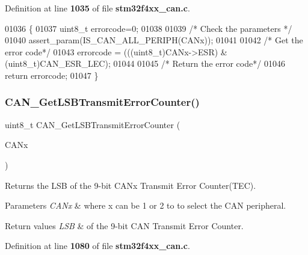 Definition at line \textbf{ 1035} of file \textbf{ stm32f4xx\+\_\+can.\+c}.


\begin{DoxyCode}
01036 \{
01037   uint8\_t errorcode=0;
01038   
01039   \textcolor{comment}{/* Check the parameters */}
01040   assert_param(IS_CAN_ALL_PERIPH(CANx));
01041   
01042   \textcolor{comment}{/* Get the error code*/}
01043   errorcode = (((uint8\_t)CANx->ESR) & (uint8\_t)CAN_ESR_LEC);
01044   
01045   \textcolor{comment}{/* Return the error code*/}
01046   \textcolor{keywordflow}{return} errorcode;
01047 \}
\end{DoxyCode}
\mbox{\label{group__CAN__Group5_ga85ee0c35bf7ca15d4e4c862eef534843}} 
\subsubsection{C\+A\+N\+\_\+\+Get\+L\+S\+B\+Transmit\+Error\+Counter()}
{\footnotesize\ttfamily uint8\+\_\+t C\+A\+N\+\_\+\+Get\+L\+S\+B\+Transmit\+Error\+Counter (\begin{DoxyParamCaption}\item[{\textbf{ C\+A\+N\+\_\+\+Type\+Def} $\ast$}]{C\+A\+Nx }\end{DoxyParamCaption})}



Returns the L\+SB of the 9-\/bit C\+A\+Nx Transmit Error Counter(\+T\+E\+C). 


\begin{DoxyParams}{Parameters}
{\em C\+A\+Nx} & where x can be 1 or 2 to to select the C\+AN peripheral. \\
\hline
\end{DoxyParams}

\begin{DoxyRetVals}{Return values}
{\em L\+SB} & of the 9-\/bit C\+AN Transmit Error Counter. \\
\hline
\end{DoxyRetVals}


Definition at line \textbf{ 1080} of file \textbf{ stm32f4xx\+\_\+can.\+c}.


